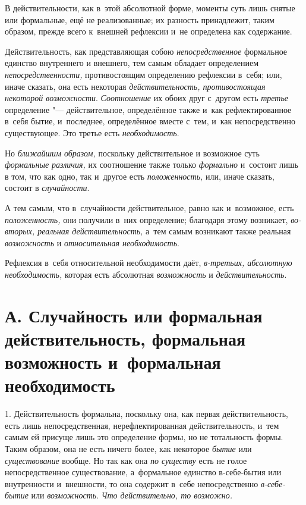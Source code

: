 В действительности, как в~этой абсолютной форме, моменты суть лишь снятые
или формальные, ещё не реализованные; их разность принадлежит, таким
образом, прежде всего к~внешней рефлексии и~не определена как содержание.

Действительность, как представляющая собою
{\em непосредственное} формальное единство внутреннего
и внешнего, тем самым обладает определением
{\em непосредственности,} противостоящим определению
рефлексии в~себя; или, иначе сказать, она есть некоторая
{\em действительность, противостоящая некоторой
возможности}. {\em Соотношение} их обоих друг с~другом
есть {\em третье} определение "--- действительное,
определённое также и~как рефлектированное в~себя бытие, и~последнее,
определённое вместе с~тем, и~как непосредственно существующее. Это третье
есть {\em необходимость}.

Но {\em ближайшим образом,} поскольку действительное и
возможное суть {\em формальные различия,} их
соотношение также только {\em формально} и~состоит лишь
в том, что как одно, так и~другое есть
{\em положенность,} или, иначе сказать, состоит в {\em случайности}.

А тем самым, что в~случайности действительное, равно как и~возможное, есть
{\em положенность,} они получили в~них определение;
благодаря этому возникает, {\em во-вторых, реальная
действительность,} а~тем самым возникают также реальная
{\em возможность} и {\em относительная необходимость}.

Рефлексия в~себя относительной необходимости даёт,
{\em в-третьих, абсолютную необходимость,} которая есть
абсолютная {\em возможность} и {\em действительность}.


\section[А. Случайность или формальная действительность, формальная возможность и~формальная необходимость]%
{А. Случайность или формальная действительность, формальная возможность и~формальная необходимость}

1. Действительность формальна, поскольку она,
как первая действительность, есть лишь непосредственная, нерефлектированная
действительность, и~тем самым ей присуще лишь это определение формы, но не
тотальность формы. Таким образом, она не есть ничего более, как некоторое
{\em бытие} или {\em существование}
вообще. Но так как она {\em по существу} есть не голое
непосредственное существование, а~формальное единство в-себе-бытия или
внутренности и~внешности, то она содержит в~себе непосредственно
{\em в-себе-бытие} или {\em возможность}. {\em Что действительно, то возможно.}

